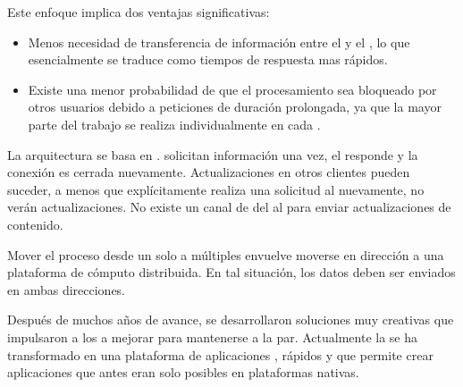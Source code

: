 Este enfoque \clientcentric implica dos ventajas significativas:
\begin{itemize}
	\item Menos necesidad de transferencia de información entre el \serverAS y el \clientAS, lo que esencialmente se traduce como tiempos de respuesta mas rápidos.
	\item Existe una menor probabilidad de que el procesamiento sea bloqueado por otros usuarios debido a peticiones de duración prolongada, ya que la mayor parte del trabajo se realiza individualmente en cada \clientAS.
\end{itemize}

La arquitectura \clientserver se basa en \statelessconnectionsINT. \clientsAS solicitan información una vez, el \serverAS responde y la conexión es cerrada nuevamente. Actualizaciones en otros clientes pueden suceder, a menos que explícitamente realiza una solicitud al \serverAS nuevamente, no verán actualizaciones. No existe un canal de \feedback del \serverAS al \clientAS para enviar actualizaciones de contenido.

Mover el proceso desde un solo \serverAS a múltiples \clientsAS envuelve moverse en dirección a una plataforma de cómputo distribuida. En tal situación, los datos deben ser enviados en ambas direcciones.

Después de muchos años de avance, se desarrollaron soluciones muy creativas que impulsaron a los \browsersINT a mejorar para mantenerse a la par. 
Actualmente la \webINT se ha transformado en una plataforma de aplicaciones \fullyfeatured, \runtimesCPT \javaScriptNAME rápidos y \standard \htmlfive que permite crear aplicaciones que antes eran solo posibles en plataformas nativas.

\subsection{\singlePageAppINT}

